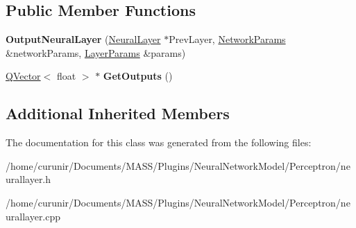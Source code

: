 \subsection*{Public Member Functions}
\begin{DoxyCompactItemize}
\item 
{\bfseries Output\+Neural\+Layer} (\hyperlink{class_neural_layer}{Neural\+Layer} $\ast$Prev\+Layer, \hyperlink{struct_perceptron_1_1_network_params}{Network\+Params} \&network\+Params, \hyperlink{struct_perceptron_1_1_layer_params}{Layer\+Params} \&params)\hypertarget{class_output_neural_layer_a715832abcf6d3cd49da63c53a48c39ea}{}\label{class_output_neural_layer_a715832abcf6d3cd49da63c53a48c39ea}

\item 
\hyperlink{class_q_vector}{Q\+Vector}$<$ float $>$ $\ast$ {\bfseries Get\+Outputs} ()\hypertarget{class_output_neural_layer_a6506d3323ab55502c0bc5e925179495b}{}\label{class_output_neural_layer_a6506d3323ab55502c0bc5e925179495b}

\end{DoxyCompactItemize}
\subsection*{Additional Inherited Members}


The documentation for this class was generated from the following files\+:\begin{DoxyCompactItemize}
\item 
/home/curunir/\+Documents/\+M\+A\+S\+S/\+Plugins/\+Neural\+Network\+Model/\+Perceptron/neurallayer.\+h\item 
/home/curunir/\+Documents/\+M\+A\+S\+S/\+Plugins/\+Neural\+Network\+Model/\+Perceptron/neurallayer.\+cpp\end{DoxyCompactItemize}
